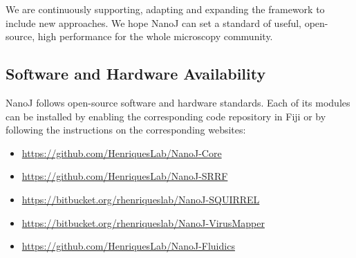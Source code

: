  We are continuously supporting, adapting and expanding the framework to include new approaches. We hope NanoJ can set a standard of useful, open-source, high performance for the whole microscopy community.
 

\subsection*{Software and Hardware Availability}
 NanoJ follows open-source software and hardware standards. Each of its modules can be installed by enabling the corresponding code repository in Fiji or by following the instructions on the corresponding websites:
 \small
 \begin{itemize}
  \item \href{https://github.com/HenriquesLab/NanoJ-Core}{https://github.com/HenriquesLab/NanoJ-Core}
  \item \href{https://github.com/HenriquesLab/NanoJ-SRRF}{https://github.com/HenriquesLab/NanoJ-SRRF}
  \item \href{https://bitbucket.org/rhenriqueslab/nanoj-squirrel}{https://bitbucket.org/rhenriqueslab/NanoJ-SQUIRREL}
  \item \href{https://bitbucket.org/rhenriqueslab/NanoJ-VirusMapper}{https://bitbucket.org/rhenriqueslab/NanoJ-VirusMapper}
  \item \href{https://github.com/HenriquesLab/NanoJ-Fluidics}{https://github.com/HenriquesLab/NanoJ-Fluidics}
\end{itemize}





